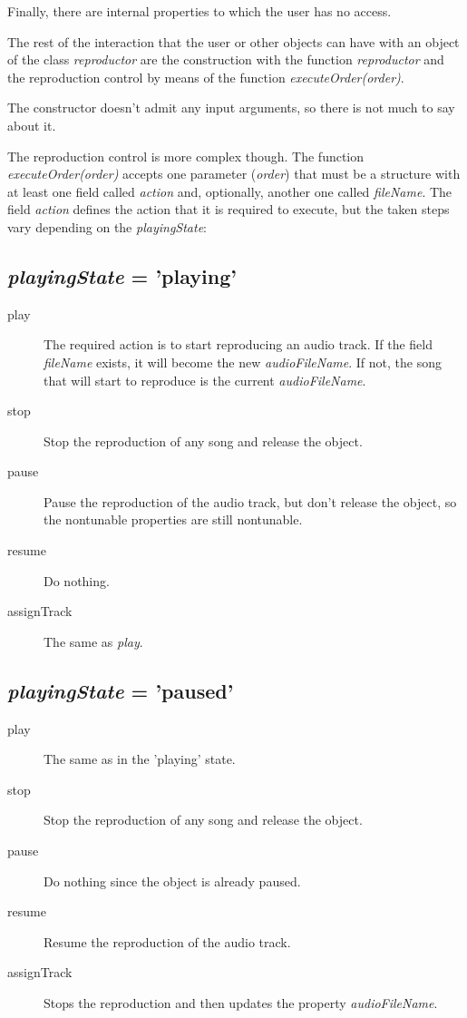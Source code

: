 Finally, there are internal properties to which the user has no access.

The rest of the interaction that the user or other objects can have with an object of the class \textit{reproductor} are the construction with the function \textit{reproductor} and the reproduction control by means of the function \textit{executeOrder(order)}.

The constructor doesn't admit any input arguments, so there is not much to say about it.

The reproduction control is more complex though. The function \textit{executeOrder(order)} accepts one parameter (\textit{order}) that must be a structure with at least one field called \textit{action} and, optionally, another one called \textit{fileName}. The field \textit{action} defines the action that it is required to execute, but the taken steps vary depending on the \textit{playingState}:


\subsection*{\textit{playingState} = 'playing'}
\begin{description}
	\item[play] The required action is to start reproducing an audio track. If the field \textit{fileName} exists, it will become the new \textit{audioFileName}. If not, the song that will start to reproduce is the current \textit{audioFileName}.
	\item[stop] Stop the reproduction of any song and release the object.
	\item[pause] Pause the reproduction of the audio track, but don't release the object, so the nontunable properties are still nontunable.
	\item[resume] Do nothing.
	\item[assignTrack] The same as \textit{play}.
\end{description}

\subsection*{\textit{playingState} = 'paused'}
\begin{description}
	\item[play] The same as in the 'playing' state.
	\item[stop] Stop the reproduction of any song and release the object.
	\item[pause] Do nothing since the object is already paused.
	\item[resume] Resume the reproduction of the audio track.
	\item[assignTrack] Stops the reproduction and then updates the property \textit{audioFileName}.
\end{description}

